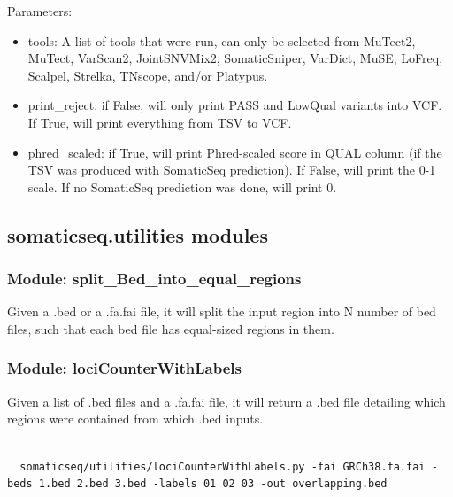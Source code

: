 \documentclass[10pt,letterpaper]{article}
\begin{document}
\begin{sloppypar}
\begin{lstlisting}
\end{lstlisting}

Parameters:

\begin{itemize}

\item tools: A list of tools that were run, can only be selected from MuTect2, MuTect, VarScan2, JointSNVMix2, SomaticSniper, VarDict, MuSE, LoFreq, Scalpel, Strelka, TNscope, and/or Platypus. 

\item print\_reject: if False, will only print PASS and LowQual variants into VCF. If True, will print everything from TSV to VCF. 

\item phred\_scaled: if True, will print Phred-scaled score in QUAL column (if the TSV was produced with SomaticSeq prediction). If False, will print the 0-1 scale. If no SomaticSeq prediction was done, will print 0. 


\end{itemize}






\subsection{somaticseq.utilities modules} \label{module:utilities}

\subsubsection{Module: split\_Bed\_into\_equal\_regions}

Given a .bed or a .fa.fai file, it will split the input region into N number of bed files, such that each bed file has equal-sized regions in them. 


\subsubsection{Module: lociCounterWithLabels}

Given a list of .bed files and a .fa.fai file, it will return a .bed file detailing which regions were contained from which .bed inputs. 

\begin{lstlisting}

  somaticseq/utilities/lociCounterWithLabels.py -fai GRCh38.fa.fai -beds 1.bed 2.bed 3.bed -labels 01 02 03 -out overlapping.bed


\end{lstlisting}
\end{sloppypar}
\end{document}
